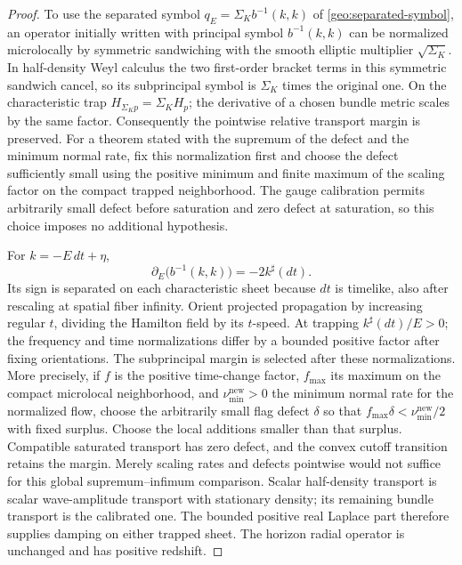 \begin{proof}
To use the separated symbol $q_E=\Sigma_Kb^{-1}(k,k)$ of
\eqref{geo:separated-symbol}, an operator initially written with principal
symbol $b^{-1}(k,k)$ can be normalized
microlocally by symmetric sandwiching with the smooth elliptic
multiplier $\sqrt{\Sigma_K}$.  In half-density Weyl calculus the
two first-order bracket terms in this symmetric sandwich cancel,
so its subprincipal symbol is $\Sigma_K$ times the original one.
On the characteristic trap $H_{\Sigma_K p}=\Sigma_KH_p$;
the derivative of a chosen bundle metric scales by the same
factor.  Consequently the pointwise relative transport margin
is preserved.  For a theorem stated with the supremum of the
defect and the minimum normal rate, fix this normalization first
and choose the defect sufficiently small using the positive
minimum and finite maximum of the scaling factor on the compact
trapped neighborhood.  The gauge calibration permits
arbitrarily small defect before saturation and zero defect at
saturation, so this choice imposes no additional hypothesis.

For $k=-E\,dt+\eta$,
\[
 \partial_E\bigl(b^{-1}(k,k)\bigr)=-2k^\sharp(dt).
\]
Its sign is separated on each characteristic sheet because $dt$
is timelike, also after rescaling at spatial fiber infinity.
Orient projected propagation by increasing regular $t$, dividing
the Hamilton field by its $t$-speed.  At trapping
$k^\sharp(dt)/E>0$; the frequency and time normalizations differ
by a bounded positive factor after fixing orientations.  The
subprincipal margin is selected after these normalizations.
More precisely, if $f$ is the positive time-change factor,
$f_{\max}$ its maximum on the compact microlocal neighborhood,
and $\nu_{\min}^{\mathrm{new}}>0$ the minimum normal rate for the
normalized flow, choose the arbitrarily small flag defect
$\delta$ so that
$f_{\max}\delta<\nu_{\min}^{\mathrm{new}}/2$ with fixed surplus.
Choose the local additions smaller than that surplus.
Compatible saturated transport has zero defect, and the convex
cutoff transition retains the margin.  Merely scaling rates
and defects pointwise would not suffice for this global
supremum--infimum comparison.  Scalar half-density transport is scalar
wave-amplitude transport with stationary density; its remaining
bundle transport is the calibrated one.  The bounded positive real
Laplace part therefore supplies damping on either trapped sheet.
The horizon radial operator is unchanged and has positive redshift.


\end{proof}
